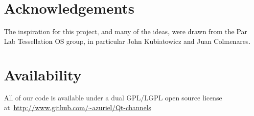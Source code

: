 \documentclass[letterpaper,twocolumn,11pt]{article}
\begin{document}
\section{Acknowledgements}

The inspiration for this project, and many of the ideas, were drawn from the Par Lab Tessellation OS group, in particular John Kubiatowicz and Juan Colmenares. 

\section{Availability}

All of our code is available under a dual GPL/LGPL open source license at~\url{http://www.github.com/~azuriel/Qt-channels}

\footnotesize{
}

\end{document}

